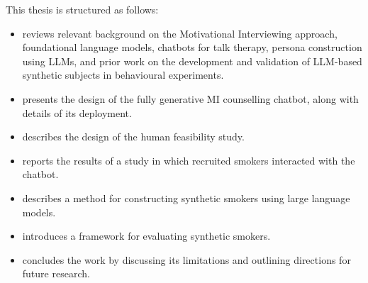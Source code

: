 This thesis is structured as follows:
\begin{itemize}
	\item {} reviews relevant background on the Motivational Interviewing approach, foundational language models, chatbots for talk therapy, persona construction using LLMs, and prior work on the development and validation of LLM-based synthetic subjects in behavioural experiments.
	\item {} presents the design of the fully generative MI counselling chatbot, along with details of its deployment.
	\item {} describes the design of the human feasibility study.
	\item {} reports the results of a study in which recruited smokers interacted with the chatbot.
	\item {} describes a method for constructing synthetic smokers using large language models.
	\item {} introduces a framework for evaluating synthetic smokers.
	\item {} concludes the work by discussing its limitations and outlining directions for future research.
\end{itemize}
